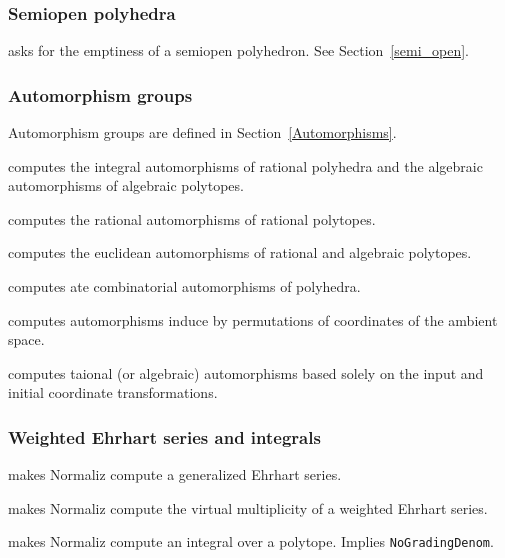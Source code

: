 \subsubsection{Semiopen polyhedra}

\begin{itemize}
	\itemtt[IsEmptySemiopen]
\end{itemize}

asks for the emptiness of a semiopen polyhedron. See Section~\ref{semi_open}.


\subsubsection{Automorphism groups}

Automorphism groups are defined in Section~\ref{Automorphisms}.
\begin{itemize}
	\itemtt[Automorphisms] computes the integral automorphisms of rational polyhedra and the algebraic automorphisms of algebraic polytopes.
	
	\itemtt [RationalAutomorphisms] computes the rational automorphisms of rational polytopes.
	
	\itemtt[EuclideanAutomorphisms] computes the euclidean automorphisms of rational and algebraic polytopes.
	
	\itemtt [CombinatorialAutomorphisms] computes ate combinatorial automorphisms of polyhedra.
	
	\itemtt[AmbientAutomorphisms] computes automorphisms induce by permutations of coordinates of the ambient space.
	
	\itemtt[InputAutomorphisms] computes taional (or algebraic) automorphisms based solely on the input and initial coordinate transformations.
\end{itemize}

\subsubsection{Weighted Ehrhart series and integrals}

\begin{itemize}
	
	\itemtt[WeightedEhrhartSeries, -E] makes Normaliz compute a generalized Ehrhart series.
	
	\itemtt[VirtualMultiplicity, -L] makes Normaliz compute the virtual multiplicity of a weighted Ehrhart series.
	
	\itemtt[Integral, -I] makes Normaliz compute an integral over a polytope. Implies \verb|NoGradingDenom|.
\end{itemize}

